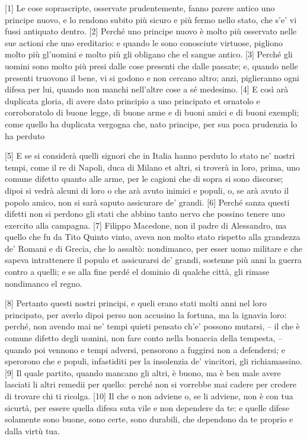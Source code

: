 {[}1{]} Le cose soprascripte, osservate prudentemente, fanno parere
antico uno principe nuovo, e lo rendono subito più sicuro e più fermo
nello stato, che s'e' vi fussi antiquato dentro. {[}2{]} Perché uno
principe nuovo è molto più osservato nelle sue actioni che uno
ereditario: e quando le sono conosciute virtuose, pigliono molto più
gl'uomini e molto più gli obligano che el sangue antico. {[}3{]} Perché
gli uomini sono molto più presi dalle cose presenti che dalle passate;
e, quando nelle presenti truovono il bene, vi si godono e non cercano
altro; anzi, piglieranno ogni difesa per lui, quando non manchi
nell'altre cose a sé medesimo. {[}4{]} E così arà duplicata gloria, di
avere dato principio a uno principato et ornatolo e corroboratolo di
buone legge, di buone arme e di buoni amici e di buoni exempli; come
quello ha duplicata vergogna che, nato principe, per sua poca prudenzia
lo ha perduto

{[}5{]} E se si considerà quelli signori che in Italia hanno perduto lo
stato ne' nostri tempi, come il re di Napoli, duca di Milano et altri,
si troverà in loro, prima, uno comune difetto quanto alle arme, per le
cagioni che di sopra si sono discorse; dipoi si vedrà alcuni di loro o
che arà avuto inimici e populi, o, se arà avuto il popolo amico, non si
sarà saputo assicurare de' grandi. {[}6{]} Perché sanza questi difetti
non si perdono gli stati che abbino tanto nervo che possino tenere uno
exercito alla campagna. {[}7{]} Filippo Macedone, non il padre di
Alessandro, ma quello che fu da Tito Quinto vinto, aveva non molto stato
rispetto alla grandezza de' Romani e di Grecia, che lo assaltò:
nondimanco, per esser uomo militare e che sapeva intrattenere il populo
et assicurarsi de' grandi, sostenne più anni la guerra contro a quelli;
e se alla fine perdé el dominio di qualche città, gli rimase nondimanco
el regno.

{[}8{]} Pertanto questi nostri principi, e queli erano stati molti anni
nel loro principato, per averlo dipoi perso non accusino la fortuna, ma
la ignavia loro: perché, non avendo mai ne' tempi quieti pensato ch'e'
possono mutarsi, -- il che è comune difetto degli uomini, non fare conto
nella bonaccia della tempesta, -- quando poi vennono e tempi adversi,
pensorono a fuggirsi non a defendersi; e sperorono che e populi,
infastiditi per la insolenzia de' vincitori, gli richiamassino. {[}9{]}
Il quale partito, quando mancano gli altri, è buono, ma è ben male avere
lasciati li altri remedii per quello: perché non si vorrebbe mai cadere
per credere di trovare chi ti ricolga. {[}10{]} Il che o non adviene o,
se li adviene, non è con tua sicurtà, per essere quella difesa suta vile
e non dependere da te: e quelle difese solamente sono buone, sono certe,
sono durabili, che dependono da te proprio e dalla virtù tua.

